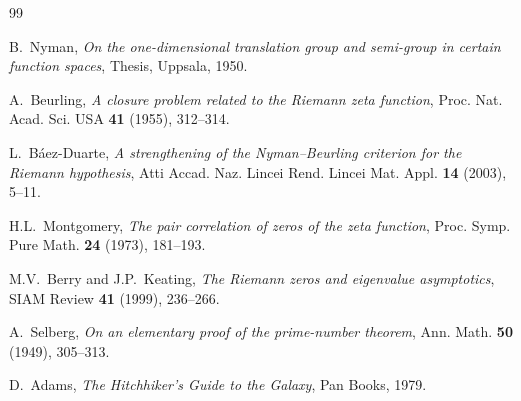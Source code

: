 \documentclass[11pt,a4paper]{article}
\theoremstyle{definition}
\begin{document}
\vspace{1cm}

\begin{thebibliography}{99}

B.~Nyman, \emph{On the one-dimensional translation group and semi-group in
certain function spaces}, Thesis, Uppsala, 1950.

A.~Beurling, \emph{A closure problem related to the Riemann zeta function},
Proc. Nat. Acad. Sci. USA \textbf{41} (1955), 312--314.

L.~B\'aez-Duarte, \emph{A strengthening of the Nyman--Beurling criterion for
the Riemann hypothesis}, Atti Accad. Naz. Lincei Rend. Lincei Mat. Appl.
\textbf{14} (2003), 5--11.

H.L.~Montgomery, \emph{The pair correlation of zeros of the zeta function},
Proc. Symp. Pure Math. \textbf{24} (1973), 181--193.

M.V.~Berry and J.P.~Keating, \emph{The Riemann zeros and eigenvalue
asymptotics}, SIAM Review \textbf{41} (1999), 236--266.

A.~Selberg, \emph{On an elementary proof of the prime-number theorem},
Ann. Math. \textbf{50} (1949), 305--313.

D.~Adams, \emph{The Hitchhiker's Guide to the Galaxy},
Pan Books, 1979.

\end{thebibliography}
\end{document}
